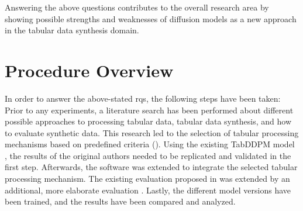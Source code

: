Answering the above questions contributes to the overall research area by showing possible strengths and weaknesses of diffusion models
as a new approach in the tabular data synthesis domain.

\section{Procedure Overview}
\label{ch:intro-proceeding}
In order to answer the above-stated \glspl{rq}, the following steps have been taken:
Prior to any experiments, a literature search has been performed about different possible approaches to processing tabular data, tabular data synthesis, and how to evaluate synthetic data.
This research led to the selection of tabular processing mechanisms based on predefined criteria ().
Using the existing TabDDPM \gls{model} \cite{kotelnikov2022TabDDPMModellingTabular}, the results of the original authors needed to be replicated and validated in the first step.
Afterwards, the software was extended to integrate the selected tabular processing mechanism.
The existing evaluation proposed in \cite{kotelnikov2022TabDDPMModellingTabular} was extended by an additional, more elaborate evaluation \cite{chundawat2022UniversalMetricRobust}.
Lastly, the different \gls{model} versions have been trained, and the results have been compared and analyzed.


